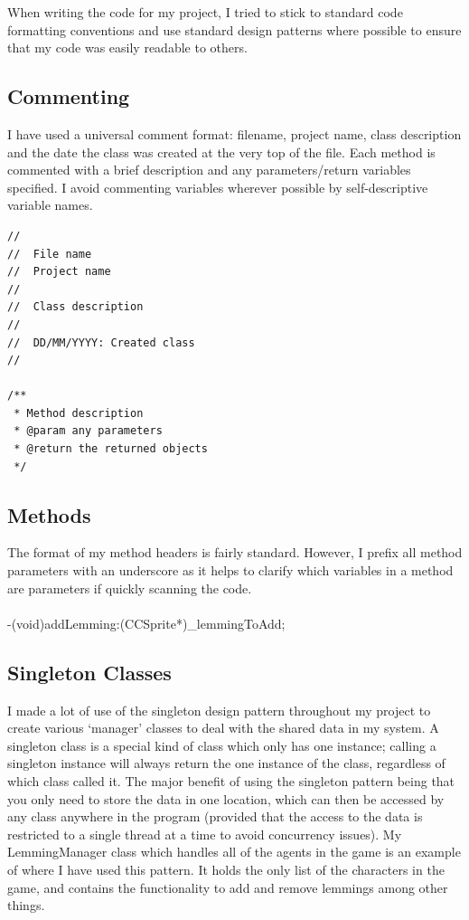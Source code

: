 \documentclass[a4paper,oneside]{report}
\begin{document}
When writing the code for my project, I tried to stick to standard code formatting conventions and use standard design patterns where possible to ensure that my code was easily readable to others. 

\subsection{Commenting}

I have used a universal comment format: filename, project name, class description and the date the class was created at the very top of the file. Each method is commented with a brief description and any parameters/return variables specified. I avoid commenting variables wherever possible by self-descriptive variable names.

\begin{lstlisting}[label=some-code,caption=Comment Formatting]
//
//  File name
//  Project name
//
//  Class description
//
//  DD/MM/YYYY: Created class
//

/**
 * Method description
 * @param any parameters
 * @return the returned objects
 */
 \end{lstlisting}

\subsection{Methods}

The format of my method headers is fairly standard. However, I prefix all method parameters with an underscore as it helps to clarify which variables in a method are parameters if quickly scanning the code.

\paragraph{}-(void)addLemming:(CCSprite*)\_lemmingToAdd;


\subsection{Singleton Classes} 

I made a lot of use of the singleton design pattern throughout my project to create various `manager' classes to deal with the shared data in my system. A singleton class is a special kind of class which only has one instance; calling a singleton instance will always return the one instance of the class, regardless of which class called it. The major benefit of using the singleton pattern being that you only need to store the data in one location, which can then be accessed by any class anywhere in the program (provided that the access to the data is restricted to a single thread at a time to avoid concurrency issues). My LemmingManager class which handles all of the agents in the game is an example of where I have used this pattern. It holds the only list of the characters in the game, and contains the functionality to add and remove lemmings among other things.
\end{document}

